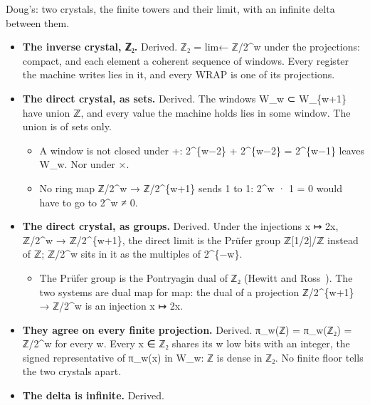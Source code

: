 Doug's: two crystals, the finite towers and their limit, with an infinite delta between them.

\begin{itemize}
\item \textbf{The inverse crystal, ℤ₂.} Derived. ℤ₂ = lim← ℤ/2\textasciicircum{}w under the projections: compact, and each element a coherent sequence of windows. Every register the machine writes lies in it, and every WRAP is one of its projections.
\item \textbf{The direct crystal, as sets.} Derived. The windows W\_\allowbreak{}w ⊂ W\_\allowbreak{}\{w+1\} have union ℤ, and every value the machine holds lies in some window. The union is of sets only.

\begin{itemize}
\item A window is not closed under +: 2\textasciicircum{}\{w−2\} + 2\textasciicircum{}\{w−2\} = 2\textasciicircum{}\{w−1\} leaves W\_\allowbreak{}w. Nor under ×.
\item No ring map ℤ/2\textasciicircum{}w → ℤ/2\textasciicircum{}\{w+1\} sends 1 to 1: 2\textasciicircum{}w · 1 = 0 would have to go to 2\textasciicircum{}w ≠ 0.
\end{itemize}
\item \textbf{The direct crystal, as groups.} Derived. Under the injections x ↦ 2x, ℤ/2\textasciicircum{}w → ℤ/2\textasciicircum{}\{w+1\}, the direct limit is the Prüfer group ℤ[1/2]/ℤ instead of ℤ; ℤ/2\textasciicircum{}w sits in it as the multiples of 2\textasciicircum{}\{−w\}.

\begin{itemize}
\item The Prüfer group is the Pontryagin dual of ℤ₂ (Hewitt and Ross~\cite{src:Hewitt-and-Ross-1963}). The two systems are dual map for map: the dual of a projection ℤ/2\textasciicircum{}\{w+1\} → ℤ/2\textasciicircum{}w is an injection x ↦ 2x.
\end{itemize}
\item \textbf{They agree on every finite projection.} Derived. π\_\allowbreak{}w(ℤ) = π\_\allowbreak{}w(ℤ₂) = ℤ/2\textasciicircum{}w for every w. Every x ∈ ℤ₂ shares its w low bits with an integer, the signed representative of π\_\allowbreak{}w(x) in W\_\allowbreak{}w: ℤ is dense in ℤ₂. No finite floor tells the two crystals apart.
\item \textbf{The delta is infinite.} Derived.


\end{itemize}
